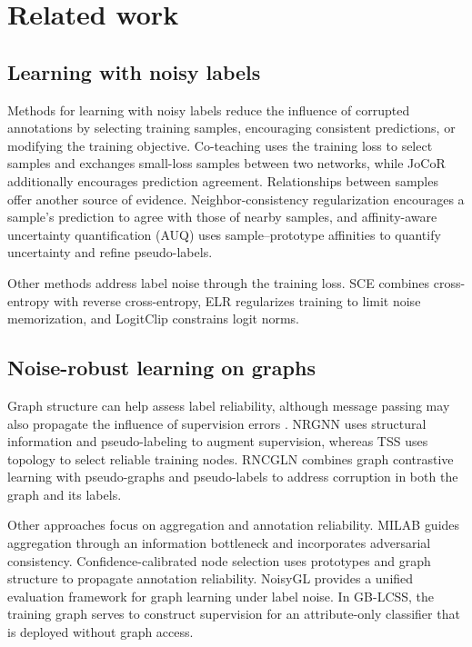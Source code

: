 \documentclass[times,review,10pt]{elsarticle}
\theoremstyle{definition}
\theoremstyle{plain}
\begin{document}
\section{Related work}\label{sec:2}

\subsection{Learning with noisy labels}\label{sec:2.1}

Methods for learning with noisy labels reduce the influence of corrupted annotations by selecting training samples, encouraging consistent predictions, or modifying the training objective. Co-teaching \cite{ref17} uses the training loss to select samples and exchanges small-loss samples between two networks, while JoCoR \cite{ref18} additionally encourages prediction agreement. Relationships between samples offer another source of evidence. Neighbor-consistency regularization \cite{ref10} encourages a sample's prediction to agree with those of nearby samples, and affinity-aware uncertainty quantification (AUQ) \cite{pr2026auq} uses sample--prototype affinities to quantify uncertainty and refine pseudo-labels.

Other methods address label noise through the training loss. SCE \cite{ref23} combines cross-entropy with reverse cross-entropy, ELR \cite{ref24} regularizes training to limit noise memorization, and LogitClip \cite{ref26} constrains logit norms.

\subsection{Noise-robust learning on graphs}\label{sec:2.2}

Graph structure can help assess label reliability, although message passing may also propagate the influence of supervision errors \cite{ref6}. NRGNN \cite{ref7} uses structural information and pseudo-labeling to augment supervision, whereas TSS \cite{ref9} uses topology to select reliable training nodes. RNCGLN \cite{ref33} combines graph contrastive learning with pseudo-graphs and pseudo-labels to address corruption in both the graph and its labels.

Other approaches focus on aggregation and annotation reliability. MILAB \cite{ref38} guides aggregation through an information bottleneck and incorporates adversarial consistency. Confidence-calibrated node selection \cite{pr2026llm} uses prototypes and graph structure to propagate annotation reliability. NoisyGL \cite{ref6} provides a unified evaluation framework for graph learning under label noise. In GB-LCSS, the training graph serves to construct supervision for an attribute-only classifier that is deployed without graph access.
\end{document}
